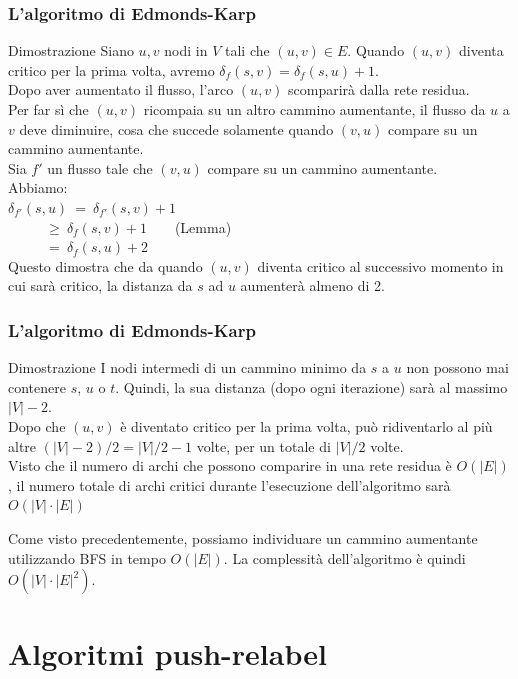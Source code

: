 \documentclass{beamer}
\begin{document}
\begin{frame}
\frametitle{L'algoritmo di Edmonds-Karp}
\begin{block}{Dimostrazione}
Siano $u,v$ nodi in $V$ tali che $(u,v)\in E$. Quando $(u,v)$ diventa critico per la prima volta, avremo $\delta_f(s,v)=\delta_f(s,u)+1$.\\
Dopo aver aumentato il flusso, l'arco $(u,v)$ scomparirà dalla rete residua.\\
Per far sì che $(u,v)$ ricompaia su un altro cammino aumentante, il flusso da $u$ a $v$ deve diminuire, cosa che succede solamente quando $(v,u)$ compare su un cammino aumentante.\\
Sia $f'$ un flusso tale che $(v,u)$ compare su un cammino aumentante.\\
Abbiamo:\\
$\delta_{f'}(s,u)\ =\ \delta_{f'}(s,v)+1$\\
$\ \ \ \ \ \ \ \ \ \ \ \ \geq\ \delta_{f}(s,v)+1$\ \ \ \ (Lemma)\\
$\ \ \ \ \ \ \ \ \ \ \ \ =\ \delta_{f}(s,u)+2$\\
Questo dimostra che da quando $(u,v)$ diventa critico al successivo momento in cui sarà critico, la distanza da $s$ ad $u$ aumenterà almeno di 2.
\end{block}
\end{frame}

\begin{frame}
\frametitle{L'algoritmo di Edmonds-Karp}
\begin{block}{Dimostrazione}
I nodi intermedi di un cammino minimo da $s$ a $u$ non possono mai contenere $s$, $u$ o $t$. Quindi, la sua distanza (dopo ogni iterazione) sarà al massimo $|V|-2$.\\
Dopo che $(u,v)$ è diventato critico per la prima volta, può ridiventarlo al più altre $(|V|-2)/2=|V|/2-1$ volte, per un totale di $|V|/2$ volte.\\
Visto che il numero di archi che possono comparire in una rete residua è $O(|E|)$, il numero totale di archi critici durante l'esecuzione dell'algoritmo sarà $O(|V|\cdot|E|)$
\end{block}
Come visto precedentemente, possiamo individuare un cammino aumentante utilizzando BFS in tempo $O(|E|)$. La complessità dell'algoritmo è quindi
 $O(|V|\cdot|E|^2)$.
\end{frame}

\section{Algoritmi push-relabel}
\end{document}
